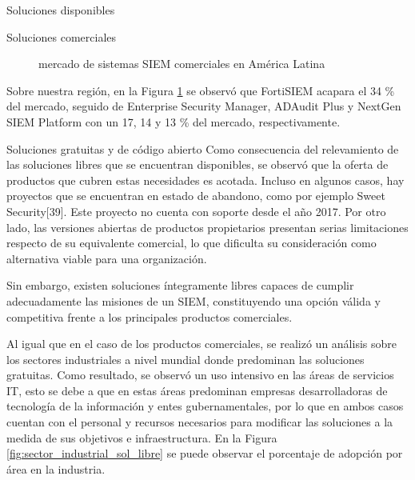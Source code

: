 \begin{section}{Soluciones disponibles}
\begin{subsection}{Soluciones comerciales}
\begin{figure}[H]
            \caption{mercado de sistemas SIEM comerciales en América Latina}
            \label{fig:comercial_latam}
        \end{figure}
        \FloatBarrier
        Sobre nuestra región, en la Figura \ref{fig:comercial_latam} se observó que FortiSIEM acapara el 34 \% del mercado, seguido de Enterprise Security Manager, ADAudit Plus y NextGen SIEM Platform con un 17, 14 y 13 \% del mercado, respectivamente.
        \end{subsection}
        
        \begin{subsection}{Soluciones gratuitas y de código abierto}
        Como consecuencia del relevamiento de las soluciones libres que se encuentran disponibles, se observó que la oferta de productos que cubren estas necesidades es acotada. Incluso en algunos casos, hay proyectos que se encuentran en estado de abandono, como por ejemplo Sweet Security[39]. Este proyecto no cuenta con soporte desde el año 2017. Por otro lado, las versiones abiertas de productos propietarios presentan serias limitaciones respecto de su equivalente comercial, lo que dificulta su consideración como alternativa viable para una organización. \par
        Sin embargo, existen soluciones íntegramente libres capaces de cumplir adecuadamente las misiones de un SIEM, constituyendo una opción válida y competitiva frente a los principales productos comerciales.\par
        Al igual que en el caso de los productos comerciales, se realizó un análisis sobre los sectores industriales a nivel mundial donde predominan las soluciones gratuitas. Como resultado, se observó un uso intensivo en las áreas de servicios IT, esto se debe a que en estas áreas predominan empresas desarrolladoras de tecnología de la información y entes gubernamentales, por lo que en ambos casos cuentan con el personal y recursos necesarios para modificar las soluciones a la medida de sus objetivos e infraestructura. En la Figura \ref{fig:sector_industrial_sol_libre} se puede observar el porcentaje de adopción por área en la industria.\par
        

\end{subsection}
\end{section}
